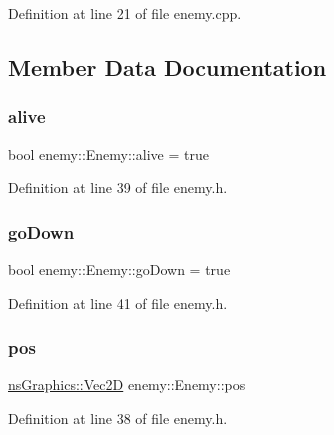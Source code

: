 Definition at line 21 of file enemy.\+cpp.



\subsection{Member Data Documentation}
\mbox{\label{structenemy_1_1_enemy_ac64a666df47674ecf4abeb467991e5cb}} 
\subsubsection{\texorpdfstring{alive}{alive}}
{\footnotesize\ttfamily bool enemy\+::\+Enemy\+::alive = true}



Definition at line 39 of file enemy.\+h.

\mbox{\label{structenemy_1_1_enemy_a03df75f44cf09e588c418e2b49388a9b}} 
\subsubsection{\texorpdfstring{go\+Down}{goDown}}
{\footnotesize\ttfamily bool enemy\+::\+Enemy\+::go\+Down = true}



Definition at line 41 of file enemy.\+h.

\mbox{\label{structenemy_1_1_enemy_a1439cd408ff71d897e2414c062a3dda4}} 
\subsubsection{\texorpdfstring{pos}{pos}}
{\footnotesize\ttfamily \hyperlink{classns_graphics_1_1_vec2_d}{ns\+Graphics\+::\+Vec2D} enemy\+::\+Enemy\+::pos}



Definition at line 38 of file enemy.\+h.

\mbox{\label{structenemy_1_1_enemy_aa59e1afdd7cba4658530a57b10152686}} 
